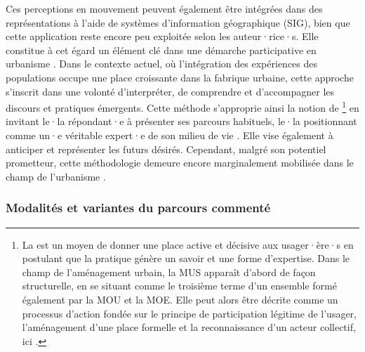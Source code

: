 \begin{refsegment}
Ces perceptions en mouvement peuvent également être intégrées dans des représentations à l’aide de systèmes d’information géographique (\acrshort{SIG}), bien que cette application reste encore peu exploitée selon les auteur·rice·s. Elle constitue à cet égard un élément clé dans une démarche participative en urbanisme \textcolor{blue}{\autocite[344]{manzo_finding_2006}}. Dans le contexte actuel, où l’intégration des expériences des populations occupe une place croissante dans la fabrique urbaine, cette approche s’inscrit dans une volonté d’interpréter, de comprendre et d’accompagner les discours et pratiques émergents. Cette méthode s’approprie ainsi la notion de \footnote{
    La  est un moyen de donner une place active et décisive aux usager·ère·s en postulant que la pratique génère un savoir et une forme d'expertise. Dans le champ de l'aménagement urbain, la \acrfull{MUS} apparaît d'abord de façon structurelle, en se situant comme le troisième terme d'un ensemble formé également par la \acrfull{MOU} et la \acrfull{MOE}. Elle peut alors être décrite comme un processus d'action fondée sur le principe de participation légitime de l'usager, l'aménagement d'une place formelle et la reconnaissance d'un acteur collectif, ici  \textcolor{blue}{\autocite[73]{vulbeau_maitrise_2014}}.
} en invitant le·la répondant·e à présenter ses parcours habituels, le·la positionnant comme un·e véritable expert·e de son milieu de vie \textcolor{blue}{\autocites[268]{carpiano_come_2009}[1~172]{miaux_making_2010}}. Elle vise également à anticiper et représenter les futurs désirés. Cependant, malgré son potentiel prometteur, cette méthodologie demeure encore marginalement mobilisée dans le champ de l’urbanisme \textcolor{blue}{\autocite[120]{bergeron_uncovering_2014}}.%

\subsubsection*{Modalités et variantes du parcours commenté
    \label{chap3:parcours-commente-definition-variantes}
    }


\end{refsegment}
